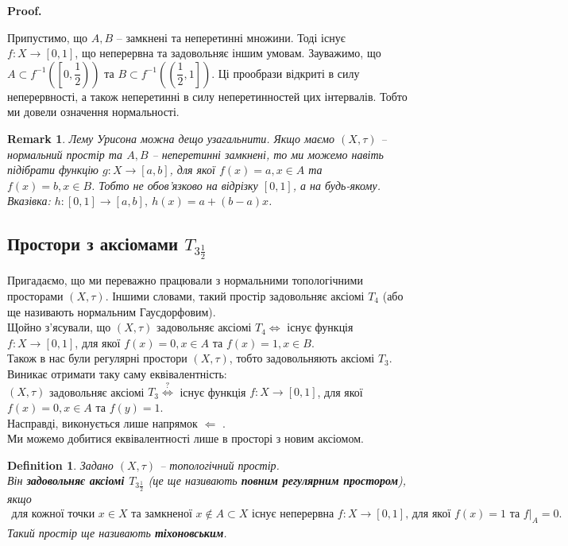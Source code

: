 \documentclass[a4paper, 10pt]{article}
\makeatletter
\def\leftproof{$\boxed{\Leftarrow}$ }
\theoremstyle{theoremdd}
\newtheorem{definition}[theorem]{Definition}
\newtheorem{remark}[theorem]{Remark}
\renewenvironment{proof}[1][Proof.\\]{\par
\pushQED{\hfill \qed}%
\normalfont \topsep6\p@\@plus6\p@\relax
\trivlist
\item\relax
{\bfseries
#1\@addpunct{.}}\hspace\labelsep\ignorespaces
}{%
\popQED\endtrivlist\@endpefalse
}
\makeatother
\begin{document}
\begin{proof}
Припустимо, що $A,B$ -- замкнені та неперетинні множини. Тоді існує $f \colon X \to [0,1]$, що неперервна та задовольняє іншим умовам. Зауважимо, що $A \subset f^{-1} \left(\left[0, \dfrac{1}{2}\right)\right)$ та $B \subset f^{-1}\left(\left(\dfrac{1}{2},1\right]\right)$. Ці прообрази відкриті в силу неперервності, а також неперетинні в силу неперетинностей цих інтервалів. Тобто ми довели означення нормальності.
\end{proof}

\begin{remark}
Лему Урисона можна дещо узагальнити. Якщо маємо $(X,\tau)$ -- нормальний простір та $A,B$ -- неперетинні замкнені, то ми можемо навіть підібрати функцію $g \colon X \to [a,b]$, для якої $f(x) = a, x \in A$ та $f(x) = b, x \in B$. Тобто не обов'язково на відрізку $[0,1]$, а на будь-якому.\\
\textit{Вказівка: $h \colon [0,1] \to [a,b],\ h(x) = a + (b-a)x$.}
\end{remark}

\subsection{Простори з аксіомами $T_{3 \frac{1}{2} }$}
Пригадаємо, що ми переважно працювали з нормальними топологічними просторами $(X,\tau)$. Іншими словами, такий простір задовольняє аксіомі $T_4$ (або ще називають нормальним Гаусдорфовим).\\
Щойно з'ясували, що $(X,\tau)$ задовольняє аксіомі $T_4 \iff$ існує функція $f \colon X \to [0,1]$, для якої $f(x) = 0, x \in A$ та $f(x) = 1, x \in B$.
\bigskip \\
Також в нас були регулярні простори $(X,\tau)$, тобто задовольняють аксіомі $T_3$. Виникає отримати таку саму еквівалентність:\\
$(X,\tau)$ задовольняє аксіомі $T_3 \overset{?}{\iff}$ існує функція $f \colon X \to [0,1]$, для якої $f(x) = 0, x \in A$ та $f(y) = 1$.\\
Насправді, виконується лише напрямок \leftproof. \\
Ми можемо добитися еквівалентності лише в просторі з новим аксіомом.
\begin{definition}
Задано $(X,\tau)$ -- топологічний простір.\\
Він \textbf{задовольняє аксіомі $T_{3 \frac{1}{2}}$} (це ще називають \textbf{повним регулярним простором}), якщо
\begin{align*}
\text{для кожної точки $x \in X$ та замкненої $x \notin A \subset X$ існує неперервна $f \colon X \to [0,1]$, для якої $f(x) = 1$ та $f|_A = 0$.}
\end{align*}
Такий простір ще називають \textbf{тіхоновським}.
\end{definition}
\end{document}
